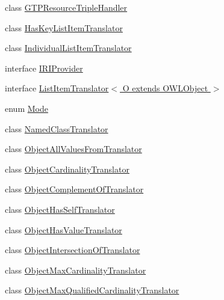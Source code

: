 \begin{DoxyCompactItemize}
\item 
class \hyperlink{classorg_1_1coode_1_1owlapi_1_1rdfxml_1_1parser_1_1_g_t_p_resource_triple_handler}{G\-T\-P\-Resource\-Triple\-Handler}
\item 
class \hyperlink{classorg_1_1coode_1_1owlapi_1_1rdfxml_1_1parser_1_1_has_key_list_item_translator}{Has\-Key\-List\-Item\-Translator}
\item 
class \hyperlink{classorg_1_1coode_1_1owlapi_1_1rdfxml_1_1parser_1_1_individual_list_item_translator}{Individual\-List\-Item\-Translator}
\item 
interface \hyperlink{interfaceorg_1_1coode_1_1owlapi_1_1rdfxml_1_1parser_1_1_i_r_i_provider}{I\-R\-I\-Provider}
\item 
interface \hyperlink{interfaceorg_1_1coode_1_1owlapi_1_1rdfxml_1_1parser_1_1_list_item_translator_3_01_o_01extends_01_o_w_l_object_01_4}{List\-Item\-Translator$<$ O extends O\-W\-L\-Object $>$}
\item 
enum \hyperlink{enumorg_1_1coode_1_1owlapi_1_1rdfxml_1_1parser_1_1_mode}{Mode}
\item 
class \hyperlink{classorg_1_1coode_1_1owlapi_1_1rdfxml_1_1parser_1_1_named_class_translator}{Named\-Class\-Translator}
\item 
class \hyperlink{classorg_1_1coode_1_1owlapi_1_1rdfxml_1_1parser_1_1_object_all_values_from_translator}{Object\-All\-Values\-From\-Translator}
\item 
class \hyperlink{classorg_1_1coode_1_1owlapi_1_1rdfxml_1_1parser_1_1_object_cardinality_translator}{Object\-Cardinality\-Translator}
\item 
class \hyperlink{classorg_1_1coode_1_1owlapi_1_1rdfxml_1_1parser_1_1_object_complement_of_translator}{Object\-Complement\-Of\-Translator}
\item 
class \hyperlink{classorg_1_1coode_1_1owlapi_1_1rdfxml_1_1parser_1_1_object_has_self_translator}{Object\-Has\-Self\-Translator}
\item 
class \hyperlink{classorg_1_1coode_1_1owlapi_1_1rdfxml_1_1parser_1_1_object_has_value_translator}{Object\-Has\-Value\-Translator}
\item 
class \hyperlink{classorg_1_1coode_1_1owlapi_1_1rdfxml_1_1parser_1_1_object_intersection_of_translator}{Object\-Intersection\-Of\-Translator}
\item 
class \hyperlink{classorg_1_1coode_1_1owlapi_1_1rdfxml_1_1parser_1_1_object_max_cardinality_translator}{Object\-Max\-Cardinality\-Translator}
\item 
class \hyperlink{classorg_1_1coode_1_1owlapi_1_1rdfxml_1_1parser_1_1_object_max_qualified_cardinality_translator}{Object\-Max\-Qualified\-Cardinality\-Translator}

\end{DoxyCompactItemize}
